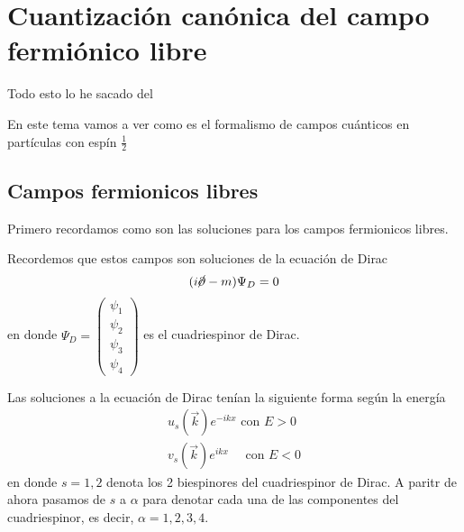\setchapterpreamble[u]{\margintoc}
\chapter{Cuantización canónica del campo fermiónico libre}

\begin{center}
  \large Todo esto lo he sacado del \cite{Dobdado}
\end{center}

En este tema vamos a ver como es el formalismo de campos cuánticos en partículas con espín $\frac{1}{2}$
\section{Campos fermionicos libres}
Primero recordamos como son las soluciones para los campos fermionicos libres.

Recordemos que estos campos son soluciones de la ecuación de Dirac 
$$
(i\cancel{\partial}-m)\Psi_D=0
$$
en donde $\Psi_D=\begin{pmatrix}
  \psi_1 \\
  \psi_2 \\
  \psi_3 \\
  \psi_4
\end{pmatrix}$ es el cuadriespinor de Dirac.


Las soluciones a la ecuación de Dirac tenían la siguiente forma según la energía
$$
\begin{aligned}
 u_s(\vec{k}) e^{-i k x} \text { con } E>0 \\
 v_s(\vec{k}) e^{i k x} \quad \text { con } E<0
\end{aligned}
$$
en donde $s=1,2$ denota los 2 biespinores del cuadriespinor de Dirac. A paritr de ahora pasamos de $s$ a $\alpha$ para denotar cada una de las componentes del cuadriespinor, es decir, $\alpha=1,2,3,4$.


